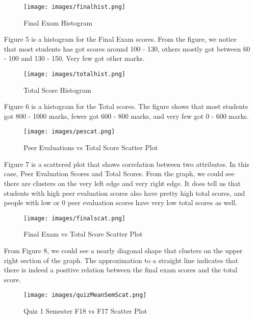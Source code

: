 \documentclass{article}
\begin{document}
\begin{figure}[h]
    \centering
    \texttt{[image: images/finalhist.png]}
    \caption{Final Exam Histogram}
\end{figure}
\begin{flushleft}
Figure 5 is a histogram for the Final Exam scores. From the figure, we notice that most students has got scores around 100 - 130, others mostly got between 60 - 100 and 130 - 150. Very few got other marks.
\end{flushleft}
\begin{figure}[h]
    \centering
    \texttt{[image: images/totalhist.png]}
    \caption{Total Score Histogram}
\end{figure}
\begin{flushleft}
Figure 6 is a histogram for the Total scores. The figure shows that most students got 800 - 1000 marks, fewer got 600 - 800 marks, and very few got 0 - 600 marks.
\end{flushleft}
\begin{figure}[h]
    \centering
    \texttt{[image: images/pescat.png]}
    \caption{Peer Evaluations vs Total Score Scatter Plot}
\end{figure}
\begin{flushleft}
Figure 7 is a scattered plot that shows correlation between two attributes. In this case, Peer Evaluation Scores and Total Scores. From the graph, we could see there are clusters on the very left edge and very right edge. It does tell us that students with high peer evaluation scores also have pretty high total scores, and people with low or 0 peer evaluation scores have very low total scores as well.
\end{flushleft}
\begin{figure}[h]
    \centering
    \texttt{[image: images/finalscat.png]}
    \caption{Final Exam vs Total Score Scatter Plot}
\end{figure}
\clearpage
\begin{flushleft}
From Figure 8, we could see a nearly diagonal shape that clusters on the upper right section of the graph. The approximation to a straight line indicates that there is indeed a positive relation between the final exam scores and the total score.
\end{flushleft}
\begin{figure}[h]
    \centering
    \texttt{[image: images/quizMeanSemScat.png]}
    \caption{Quiz 1 Semester F18 vs F17 Scatter Plot}
\end{figure}
\end{document}
